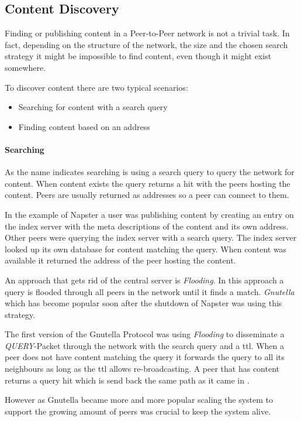 \subsection{Content Discovery}
Finding or publishing content in a Peer-to-Peer network is not a trivial task. In fact, depending on the structure of the network, the size and the chosen search strategy it might be impossible to find content, even though it might exist somewhere.

To discover content there are two typical scenarios:
\begin{itemize}
  \item Searching for content with a search query
  \item Finding content based on an address
\end{itemize}

\paragraph{Searching}
As the name indicates searching is using a search query to query the network for content. When content exists the query returns a hit with the peers hosting the content. Peers are usually returned as addresses so a peer can connect to them.

In the example of Napster a user was publishing content by creating an entry on the index server with the meta descriptions of the content and its own address. Other peers were querying the index server with a search query. The index server looked up its own database for content matching the query. When content was available it returned the address of the peer hosting the content. 

An approach that gets rid of the central server is \textit{Flooding}. In this approach a query is flooded through all peers in the network until it finds a match. \textit{Gnutella} which has become popular soon after the shutdown of Napster was using this strategy.

The first version of the Gnutella Protocol was using \textit{Flooding} to disseminate a \textit{QUERY}-Packet through the network with the search query and a \gls{ttl}. When a peer does not have content matching the query it forwards the query to all its neighbours as long as the \gls{ttl} allows re-broadcasting. A peer that has content returns a query hit which is send back the same path as it came in \cite[\S4]{gnutella04}.

However as Gnutella became more and more popular scaling the system to support the growing amount of peers was crucial to keep the system alive.  \cite[\S3.1]{gnutellaAnalysis}

